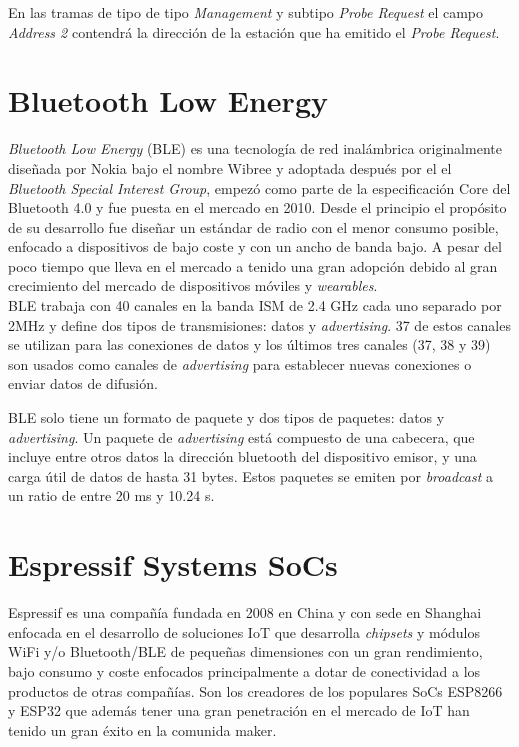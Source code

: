 \documentclass[../proyecto.tex]{subfiles}
\begin{document}
En las tramas de tipo de tipo \textit{Management} y subtipo \textit{Probe Request} el campo \textit{Address 2} contendrá la dirección de la estación que ha emitido el \textit{Probe Request}.

\section{Bluetooth Low Energy}

\textit{Bluetooth Low Energy} (BLE) es una tecnología de red inalámbrica originalmente diseñada por Nokia bajo el nombre Wibree y adoptada después por el  el \textit{Bluetooth Special Interest Group}, empezó como parte de la especificación Core del Bluetooth 4.0 y fue puesta en el mercado en 2010. Desde el principio el propósito de su desarrollo fue diseñar un estándar de radio con el menor consumo posible, enfocado a dispositivos de bajo coste y con un ancho de banda bajo. A pesar del poco tiempo que lleva en el mercado a tenido una gran adopción debido al gran crecimiento del mercado de dispositivos móviles y \textit{wearables}.\\


BLE trabaja con 40 canales en la banda ISM de 2.4 GHz cada uno separado por 2MHz y define dos tipos de transmisiones: datos y \textit{advertising}. 37 de estos canales se utilizan para las conexiones de datos y los últimos tres canales (37, 38 y 39) son usados como canales de \textit{advertising} para establecer nuevas conexiones o enviar datos de difusión.


BLE solo tiene un formato de paquete y dos tipos de paquetes: datos y \textit{advertising}. Un paquete de \textit{advertising} está compuesto de una cabecera, que incluye entre otros datos la dirección bluetooth del dispositivo emisor, y una carga útil de datos de hasta 31 bytes. Estos paquetes se emiten por \textit{broadcast} a un ratio de entre 20 ms y 10.24 s.


\section{Espressif Systems SoCs}
Espressif es una compañía fundada en 2008 en China y con sede en Shanghai enfocada en el desarrollo de soluciones IoT que desarrolla \textit{chipsets} y módulos WiFi y/o Bluetooth/BLE de pequeñas dimensiones con un gran rendimiento, bajo consumo y coste enfocados principalmente a dotar de conectividad a los productos de otras compañías. Son los creadores de los populares SoCs ESP8266 y ESP32 que además tener una gran penetración en el mercado de IoT han tenido un gran éxito en la comunida maker.
\end{document}

